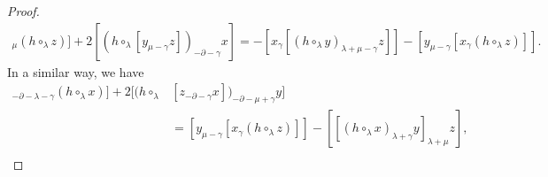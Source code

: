 \documentclass[11pt,letterpaper,reqno]{amsart}
\theoremstyle{definition}
\numberwithin{equation}{section}
\begin{document}
\begin{proof}
\begin{align*}
      [[x_{\gamma}y]_{\mu}(h\circ_{\lambda}z)]+2[(h\circ_{\lambda}[y_{\mu-\gamma}z])_{-\partial-\gamma}x]=-[x_{\gamma}[(h\circ_{\lambda}y)_{\lambda+\mu-\gamma}z]]-[y_{\mu-\gamma}[x_{\gamma}(h\circ_{\lambda}z)]].
   \end{align*}
In a similar way, we have
   \begin{align*}
      [[y_{\mu-\gamma}z]_{-\partial-\lambda-\gamma}(h\circ_{\lambda}x)]+2[(h\circ_{\lambda}&[z_{-\partial-\gamma}x])_{-\partial-\mu+\gamma}y] \nonumber\\
      &=[y_{\mu-\gamma}[x_{\gamma}(h\circ_{\lambda}z)]]-[[(h\circ_{\lambda}x)_{\lambda+\gamma}y]_{\lambda+\mu}z],\\

\end{align*}
\end{proof}
\end{document}
